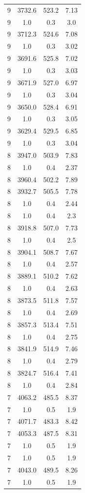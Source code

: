 \begin{table}[htbp]
\begin{tabular}{c c c c}
9 & 3732.6 & 523.2 & 7.13 \\
9 & 1.0 & 0.3 & 3.0 \\
9 & 3712.3 & 524.6 & 7.08 \\
9 & 1.0 & 0.3 & 3.02 \\
9 & 3691.6 & 525.8 & 7.02 \\
9 & 1.0 & 0.3 & 3.03 \\
9 & 3671.9 & 527.0 & 6.97 \\
9 & 1.0 & 0.3 & 3.04 \\
9 & 3650.0 & 528.4 & 6.91 \\
9 & 1.0 & 0.3 & 3.05 \\
9 & 3629.4 & 529.5 & 6.85 \\
9 & 1.0 & 0.3 & 3.04 \\
8 & 3947.0 & 503.9 & 7.83 \\
8 & 1.0 & 0.4 & 2.37 \\
8 & 3960.4 & 502.2 & 7.89 \\
8 & 3932.7 & 505.5 & 7.78 \\
8 & 1.0 & 0.4 & 2.44 \\
8 & 1.0 & 0.4 & 2.3 \\
8 & 3918.8 & 507.0 & 7.73 \\
8 & 1.0 & 0.4 & 2.5 \\
8 & 3904.1 & 508.7 & 7.67 \\
8 & 1.0 & 0.4 & 2.57 \\
8 & 3889.1 & 510.2 & 7.62 \\
8 & 1.0 & 0.4 & 2.63 \\
8 & 3873.5 & 511.8 & 7.57 \\
8 & 1.0 & 0.4 & 2.69 \\
8 & 3857.3 & 513.4 & 7.51 \\
8 & 1.0 & 0.4 & 2.75 \\
8 & 3841.9 & 514.9 & 7.46 \\
8 & 1.0 & 0.4 & 2.79 \\
8 & 3824.7 & 516.4 & 7.41 \\
8 & 1.0 & 0.4 & 2.84 \\
7 & 4063.2 & 485.5 & 8.37 \\
7 & 1.0 & 0.5 & 1.9 \\
7 & 4071.7 & 483.3 & 8.42 \\
7 & 4053.3 & 487.5 & 8.31 \\
7 & 1.0 & 0.5 & 1.9 \\
7 & 1.0 & 0.5 & 1.9 \\
7 & 4043.0 & 489.5 & 8.26 \\
7 & 1.0 & 0.5 & 1.9 \\

\end{tabular}
\end{table}
